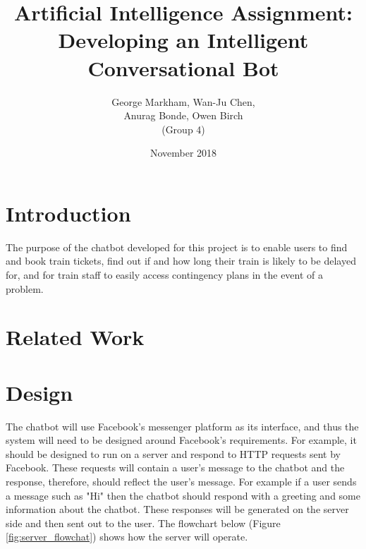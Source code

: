 \documentclass[12pt,a4paper]{article}
\title{Artificial Intelligence Assignment: Developing an Intelligent Conversational Bot}
\author{George Markham, Wan-Ju Chen, \\ Anurag Bonde, Owen Birch \\ (Group 4)} %
\date{November 2018}
\begin{document}
    \maketitle
    \section{Introduction}
    The purpose of the chatbot developed for this project is to enable users to find and book train tickets, find out if and how long their train is likely to be delayed for, and for train staff to easily access contingency plans in the event of a problem.
    \section{Related Work}
    \section{Design}
    The chatbot will use Facebook's messenger platform as its interface, and thus the system will need to be designed around Facebook's requirements. For example, it should be designed to run on a server and respond to HTTP requests sent by Facebook. These requests will contain a user's message to the chatbot and the response, therefore, should reflect the user's message. For example if a user sends a message such as "Hi" then the chatbot should respond with a greeting and some information about the chatbot. These responses will be generated on the server side and then sent out to the user. The flowchart below (Figure \ref{fig:server_flowchat}) shows how the server will operate.
    
\end{document}
